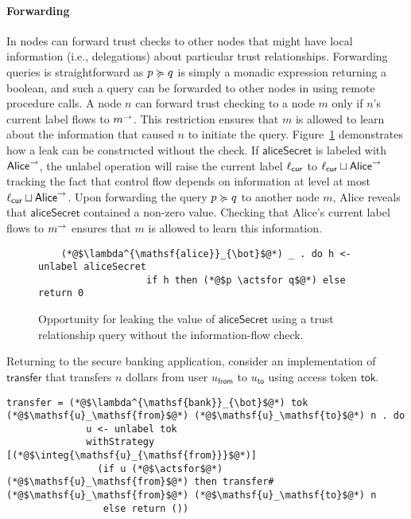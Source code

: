 \paragraph{Forwarding}
In \lang{} nodes can forward trust checks to other nodes that might have local information (i.e., delegations) about particular trust relationships. Forwarding queries is straightforward as $p \succcurlyeq q$ is simply a monadic expression returning a boolean, and such a query can be forwarded to other nodes in \lang{} using remote procedure calls.
A node $n$ can forward trust checking to a node $m$ only if $n$'s current label flows to $m^{\rightarrow}$. This restriction ensures that $m$ is allowed to learn about the information that caused $n$ to initiate the query. Figure~\ref{fig:leak-via-forward} demonstrates how a leak can be constructed without the check. If $\mathsf{aliceSecret}$ is labeled with $\mathsf{Alice}^{\rightarrow}$, the unlabel operation will raise the current label $\ell_{\mathsf{cur}}$ to $\ell_{\mathsf{cur}} \sqcup \mathsf{Alice}^{\rightarrow}$ tracking the fact that control flow depends on information at level at most $\ell_{\mathsf{cur}} \sqcup \mathsf{Alice}^{\rightarrow}$. Upon forwarding the query $p \succcurlyeq q$ to another node $m$, Alice reveals that $\mathsf{aliceSecret}$ contained a non-zero value. Checking that Alice's current label flows to $m^{\rightarrow}$ ensures that $m$ is allowed to learn this information.

\begin{figure}
    \centering
    \begin{lstlisting}
    (*@$\lambda^{\mathsf{alice}}_{\bot}$@*) _ . do h <- unlabel aliceSecret
                   if h then (*@$p \actsfor q$@*) else return 0
    \end{lstlisting}
    \caption{Opportunity for leaking the value of $\mathsf{aliceSecret}$ using a trust relationship query without the information-flow check.}
    \label{fig:leak-via-forward}
\end{figure}

Returning to the secure banking application, consider an implementation of $\mathsf{transfer}$ that transfers $n$ dollars from user $u_\mathsf{from}$ to $u_\mathsf{to}$ using access token $\mathsf{tok}$.

\begin{lstlisting}
transfer = (*@$\lambda^{\mathsf{bank}}_{\bot}$@*) tok (*@$\mathsf{u}_\mathsf{from}$@*) (*@$\mathsf{u}_\mathsf{to}$@*) n . do
              u <- unlabel tok
              withStrategy [(*@$\integ{\mathsf{u}_{\mathsf{from}}}$@*)]
                (if u (*@$\actsfor$@*) (*@$\mathsf{u}_\mathsf{from}$@*) then transfer# (*@$\mathsf{u}_\mathsf{from}$@*) (*@$\mathsf{u}_\mathsf{to}$@*) n
                 else return ())
\end{lstlisting}

